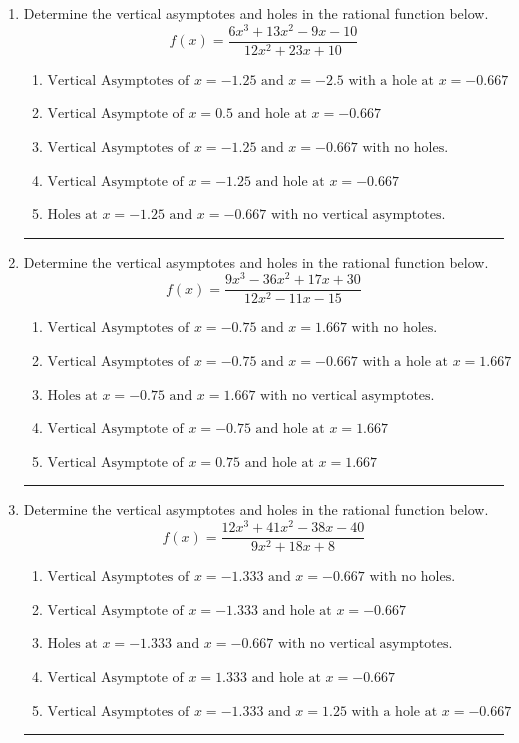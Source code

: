 \documentclass[14pt]{extbook}
\newcommand{\litem}[1]{\item#1\hspace*{-1cm}\rule{\textwidth}{0.4pt}}
\begin{document}
\begin{enumerate}
{\begin{enumerate}[label=\Alph*.]
\end{enumerate} }
\litem{
Determine the vertical asymptotes and holes in the rational function below.\[ f(x) = \frac{6x^{3} +13 x^{2} -9 x -10}{12x^{2} +23 x + 10} \]\begin{enumerate}[label=\Alph*.]
\item \( \text{Vertical Asymptotes of } x = -1.25 \text{ and } x = -2.5 \text{ with a hole at } x = -0.667 \)
\item \( \text{Vertical Asymptote of } x = 0.5 \text{ and hole at } x = -0.667 \)
\item \( \text{Vertical Asymptotes of } x = -1.25 \text{ and } x = -0.667 \text{ with no holes.} \)
\item \( \text{Vertical Asymptote of } x = -1.25 \text{ and hole at } x = -0.667 \)
\item \( \text{Holes at } x = -1.25 \text{ and } x = -0.667 \text{ with no vertical asymptotes.} \)

\end{enumerate} }
\litem{
Determine the vertical asymptotes and holes in the rational function below.\[ f(x) = \frac{9x^{3} -36 x^{2} +17 x + 30}{12x^{2} -11 x -15} \]\begin{enumerate}[label=\Alph*.]
\item \( \text{Vertical Asymptotes of } x = -0.75 \text{ and } x = 1.667 \text{ with no holes.} \)
\item \( \text{Vertical Asymptotes of } x = -0.75 \text{ and } x = -0.667 \text{ with a hole at } x = 1.667 \)
\item \( \text{Holes at } x = -0.75 \text{ and } x = 1.667 \text{ with no vertical asymptotes.} \)
\item \( \text{Vertical Asymptote of } x = -0.75 \text{ and hole at } x = 1.667 \)
\item \( \text{Vertical Asymptote of } x = 0.75 \text{ and hole at } x = 1.667 \)

\end{enumerate} }
\litem{
Determine the vertical asymptotes and holes in the rational function below.\[ f(x) = \frac{12x^{3} +41 x^{2} -38 x -40}{9x^{2} +18 x + 8} \]\begin{enumerate}[label=\Alph*.]
\item \( \text{Vertical Asymptotes of } x = -1.333 \text{ and } x = -0.667 \text{ with no holes.} \)
\item \( \text{Vertical Asymptote of } x = -1.333 \text{ and hole at } x = -0.667 \)
\item \( \text{Holes at } x = -1.333 \text{ and } x = -0.667 \text{ with no vertical asymptotes.} \)
\item \( \text{Vertical Asymptote of } x = 1.333 \text{ and hole at } x = -0.667 \)
\item \( \text{Vertical Asymptotes of } x = -1.333 \text{ and } x = 1.25 \text{ with a hole at } x = -0.667 \)


\end{enumerate}}
\end{enumerate}
\end{document}
